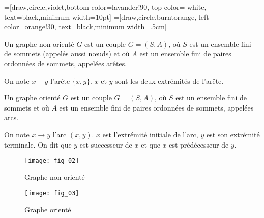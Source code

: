 
\def\lav{lavander!90}
\def\oran{orange!30}

=[draw,circle,violet,bottom color=\lav,
                  top color= white, text=black,minimum width=10pt]
=[draw,circle,burntorange, left color=\oran,
                       text=black,minimum width=.5cm]

                        
% 
% 
%  
%
%
%


\begin{defi}
Un graphe non orienté $G$ est un couple $G=(S,A)$, où $S$ est un ensemble fini de sommets (appelés aussi n\oe uds)  et où $A$ est un ensemble fini de paires ordonnées de sommets, appelées arêtes.

On note $x - y$ l'arête $\{x,y\}$. $x$ et $y$ sont les deux extrémités de l'arête.
\end{defi}

\begin{defi}\cite{ref_01}
Un graphe orienté $G$ est un couple $G=(S,A)$, où $S$ est un ensemble fini de sommets et où $A$ est un ensemble fini de paires ordonnées de sommets, appelées arcs.

On note $x\to y$ l'arc $(x,y)$. $x$ est l'extrémité initiale de l'arc, $y$ est son extrémité terminale. On dit que $y$ est successeur de $x$ et que $x$ est prédécesseur de $y$. 
\end{defi}




\begin{multicols}{2}


\begin{figure}[H]
\texttt{[image: fig\_02]}
\captionsetup{justification=centering}
\caption{Graphe non orienté \label{fig_02}}
\end{figure}


\begin{figure}[H]
\texttt{[image: fig\_03]}
\captionsetup{justification=centering}
\caption{Graphe orienté}
\end{figure}
\end{multicols}


